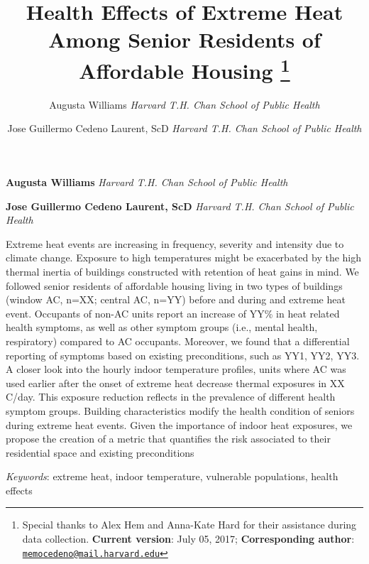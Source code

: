 \documentclass[11pt,]{article}
\title{Health Effects of Extreme Heat Among Senior Residents of Affordable
Housing \thanks{Special thanks to Alex Hem and Anna-Kate Hard for their assistance
during data collection. \textbf{Current version}: July 05, 2017;
\textbf{Corresponding author}:
\href{mailto:memocedeno@mail.harvard.edu}{\nolinkurl{memocedeno@mail.harvard.edu}}}  }
\author{\Large Augusta Williams\vspace{0.05in} \newline\normalsize\emph{Harvard T.H. Chan School of Public Health}   \and \Large Jose Guillermo Cedeno Laurent, ScD\vspace{0.05in} \newline\normalsize\emph{Harvard T.H. Chan School of Public Health}  }
\date{}
\newcommand*{\authorfont}{\fontfamily{phv}\selectfont}
\renewenvironment{abstract}
 {{%
    \setlength{\leftmargin}{0mm}
    \setlength{\rightmargin}{\leftmargin}%
  }%
  \relax}
 {\endlist}
\begin{document}
	
%

{%
\setlength{\parindent}{0pt}
\thispagestyle{plain}
{\fontsize{18}{20}\selectfont\raggedright 
\maketitle  %

}

{
   \vskip 13.5pt\relax \normalsize\fontsize{11}{12} 
\textbf{\authorfont Augusta Williams} \hskip 15pt \emph{\small Harvard T.H. Chan School of Public Health}   \par \textbf{\authorfont Jose Guillermo Cedeno Laurent, ScD} \hskip 15pt \emph{\small Harvard T.H. Chan School of Public Health}   

}

}







\begin{abstract}

    \hbox{\vrule height .2pt width 39.14pc}

    \vskip 8.5pt %

\noindent Extreme heat events are increasing in frequency, severity and intensity
due to climate change. Exposure to high temperatures might be
exacerbated by the high thermal inertia of buildings constructed with
retention of heat gains in mind. We followed senior residents of
affordable housing living in two types of buildings (window AC, n=XX;
central AC, n=YY) before and during and extreme heat event. Occupants of
non-AC units report an increase of YY\% in heat related health symptoms,
as well as other symptom groups (i.e., mental health, respiratory)
compared to AC occupants. Moreover, we found that a differential
reporting of symptoms based on existing preconditions, such as YY1, YY2,
YY3. A closer look into the hourly indoor temperature profiles, units
where AC was used earlier after the onset of extreme heat decrease
thermal exposures in XX C/day. This exposure reduction reflects in the
prevalence of different health symptom groups. Building characteristics
modify the health condition of seniors during extreme heat events. Given
the importance of indoor heat exposures, we propose the creation of a
metric that quantifies the risk associated to their residential space
and existing preconditions


\vskip 8.5pt \noindent \emph{Keywords}: extreme heat, indoor temperature, vulnerable populations, health effects \par

    \hbox{\vrule height .2pt width 39.14pc}



\end{abstract}
\end{document}
